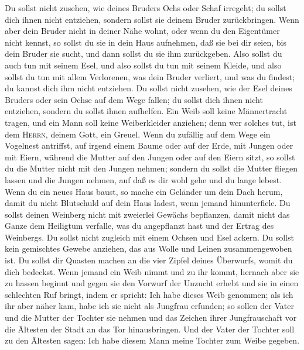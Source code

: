  Du sollst nicht zusehen, wie deines Bruders Ochs oder
Schaf irregeht; du sollst dich ihnen nicht entziehen, sondern sollst sie
deinem Bruder zurückbringen.  Wenn aber dein Bruder nicht
in deiner Nähe wohnt, oder wenn du den Eigentümer nicht kennst, so
sollst du sie in dein Haus aufnehmen, daß sie bei dir seien, bis dein
Bruder sie sucht, und dann sollst du sie ihm zurückgeben. 
Also sollst du auch tun mit seinem Esel, und also sollst du tun mit
seinem Kleide, und also sollst du tun mit allem Verlorenen, was dein
Bruder verliert, und was du findest; du kannst dich ihm nicht entziehen.
 Du sollst nicht zusehen, wie der Esel deines Bruders oder
sein Ochse auf dem Wege fallen; du sollst dich ihnen nicht entziehen,
sondern du sollst ihnen aufhelfen.  Ein Weib soll keine
Männertracht tragen, und ein Mann soll keine Weiberkleider anziehen;
denn wer solches tut, ist dem \textsc{Herrn}, deinem Gott, ein Greuel.
 Wenn du zufällig auf dem Wege ein Vogelnest antriffst,
auf irgend einem Baume oder auf der Erde, mit Jungen oder mit Eiern,
während die Mutter auf den Jungen oder auf den Eiern sitzt, so sollst du
die Mutter nicht mit den Jungen nehmen;  sondern du sollst
die Mutter fliegen lassen und die Jungen nehmen, auf daß es dir wohl
gehe und du lange lebest.  Wenn du ein neues Haus baust,
so mache ein Geländer um dein Dach herum, damit du nicht Blutschuld auf
dein Haus ladest, wenn jemand hinunterfiele.  Du sollst
deinen Weinberg nicht mit zweierlei Gewächs bepflanzen, damit nicht das
Ganze dem Heiligtum verfalle, was du angepflanzt hast und der Ertrag des
Weinbergs.  Du sollst nicht zugleich mit einem Ochsen und
Esel ackern.  Du sollst kein gemischtes Gewebe anziehen,
das aus Wolle und Leinen zusammengewoben ist.  Du sollst
dir Quasten machen an die vier Zipfel deines Überwurfs, womit du dich
bedeckst.  Wenn jemand ein Weib nimmt und zu ihr kommt,
hernach aber sie zu hassen beginnt  und gegen sie den
Vorwurf der Unzucht erhebt und sie in einen schlechten Ruf bringt, indem
er spricht: Ich habe dieses Weib genommen; als ich ihr aber näher kam,
habe ich sie nicht als Jungfrau erfunden;  so sollen der
Vater und die Mutter der Tochter sie nehmen und das Zeichen ihrer
Jungfrauschaft vor die Ältesten der Stadt an das Tor hinausbringen.
 Und der Vater der Tochter soll zu den Ältesten sagen:
Ich habe diesem Mann meine Tochter zum Weibe gegeben. 
